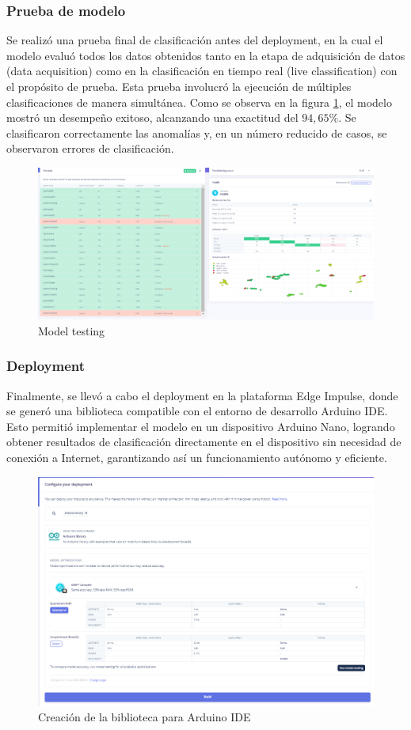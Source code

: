 \documentclass[12pt,a4paper]{article}
\begin{document}
\subsubsection{Prueba de modelo}
Se realizó una prueba final de clasificación antes del deployment, en la cual el modelo evaluó todos los datos obtenidos tanto en la etapa de adquisición de datos (data acquisition) como en la clasificación en tiempo real (live classification) con el propósito de prueba. Esta prueba involucró la ejecución de múltiples clasificaciones de manera simultánea. Como se observa en la figura \ref{fig:17}, el modelo mostró un desempeño exitoso, alcanzando una exactitud del $94,65\%$. Se clasificaron correctamente las anomalías y, en un número reducido de casos, se observaron errores de clasificación.
\begin{figure}[H]
    \centering
    \includegraphics[width=0.8\linewidth]{Imagenes/model_testing.png}
    \caption{Model testing}
    \label{fig:17}
\end{figure}

\subsubsection{Deployment}
Finalmente, se llevó a cabo el deployment en la plataforma Edge Impulse, donde se generó una biblioteca compatible con el entorno de desarrollo Arduino IDE. Esto permitió implementar el modelo en un dispositivo Arduino Nano, logrando obtener resultados de clasificación directamente en el dispositivo sin necesidad de conexión a Internet, garantizando así un funcionamiento autónomo y eficiente.
\begin{figure}[H]
    \centering
    \includegraphics[width=0.6\linewidth]{Imagenes/deployment.png}
    \caption{Creación de la biblioteca para Arduino IDE}
    \label{fig:18}
\end{figure}
\end{document}
